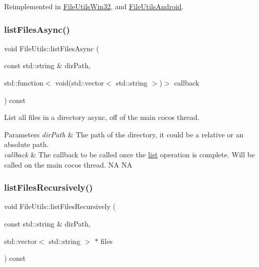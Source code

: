 Reimplemented in \hyperlink{classFileUtilsWin32_aa7a02a2d86383277ea72b7581da0b5db}{File\+Utils\+Win32}, and \hyperlink{classFileUtilsAndroid_a05bcda7dcc030c83573c7138caebad4c}{File\+Utils\+Android}.

\mbox{\label{classFileUtils_a9156e423bdacb8a2259c145d708ebd9f}} 
\subsubsection{\texorpdfstring{list\+Files\+Async()}{listFilesAsync()}}
{\footnotesize\ttfamily void File\+Utils\+::list\+Files\+Async (\begin{DoxyParamCaption}\item[{const std\+::string \&}]{dir\+Path,  }\item[{std\+::function$<$ void(std\+::vector$<$ std\+::string $>$)$>$}]{callback }\end{DoxyParamCaption}) const\hspace{0.3cm}{\ttfamily [virtual]}}

List all files in a directory async, off of the main cocos thread.


\begin{DoxyParams}{Parameters}
{\em dir\+Path} & The path of the directory, it could be a relative or an absolute path. \\
\hline
{\em callback} & The callback to be called once the \hyperlink{protocollist-p}{list} operation is complete. Will be called on the main cocos thread.  NA  NA \\
\hline
\end{DoxyParams}
\mbox{\label{classFileUtils_a9507d436baf8e10b6880bb1779649a54}} 
\subsubsection{\texorpdfstring{list\+Files\+Recursively()}{listFilesRecursively()}}
{\footnotesize\ttfamily void File\+Utils\+::list\+Files\+Recursively (\begin{DoxyParamCaption}\item[{const std\+::string \&}]{dir\+Path,  }\item[{std\+::vector$<$ std\+::string $>$ $\ast$}]{files }\end{DoxyParamCaption}) const\hspace{0.3cm}{\ttfamily [virtual]}}

